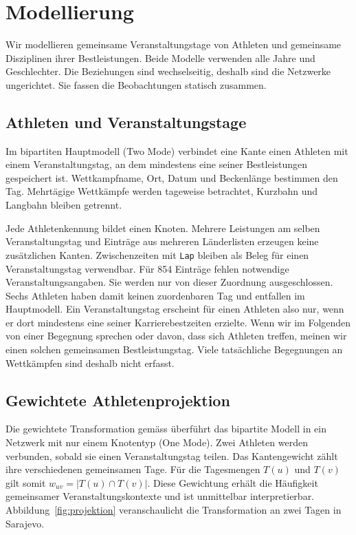 \section{Modellierung}
\label{sec:modellierung}

Wir modellieren gemeinsame Veranstaltungstage von Athleten und gemeinsame
Disziplinen ihrer Bestleistungen. Beide Modelle verwenden alle Jahre und
Geschlechter. Die Beziehungen sind wechselseitig, deshalb sind die Netzwerke
ungerichtet. Sie fassen die Beobachtungen statisch zusammen.

\subsection{Athleten und Veranstaltungstage}
Im bipartiten Hauptmodell (Two Mode) verbindet eine Kante einen Athleten mit einem
Veranstaltungstag, an dem mindestens eine seiner Bestleistungen gespeichert
ist. Wettkampfname, Ort, Datum und Beckenlänge bestimmen den Tag.
Mehrtägige Wettkämpfe werden tageweise betrachtet, Kurzbahn und Langbahn
bleiben getrennt.

Jede Athletenkennung bildet einen Knoten. Mehrere Leistungen am selben
Veranstaltungstag und Einträge aus mehreren Länderlisten erzeugen keine
zusätzlichen Kanten. Zwischenzeiten mit \texttt{Lap} bleiben als Beleg für
einen Veranstaltungstag verwendbar. Für 854 Einträge fehlen notwendige
Veranstaltungsangaben. Sie werden nur von dieser Zuordnung ausgeschlossen.
Sechs Athleten haben damit keinen zuordenbaren Tag und entfallen im
Hauptmodell. Ein Veranstaltungstag erscheint für einen Athleten also nur, wenn er dort mindestens eine seiner Karrierebestzeiten erzielte. Wenn wir im Folgenden von einer Begegnung sprechen oder davon, dass sich Athleten treffen, meinen wir einen solchen gemeinsamen Bestleistungstag. Viele tatsächliche Begegnungen an Wettkämpfen sind deshalb nicht erfasst.

\subsection{Gewichtete Athletenprojektion}
Die gewichtete Transformation gemäss \textcite[S.~38]{henninger2024}
überführt das bipartite Modell in ein Netzwerk mit nur einem Knotentyp (One Mode).
Zwei Athleten werden verbunden, sobald sie einen Veranstaltungstag teilen.
Das Kantengewicht zählt ihre verschiedenen gemeinsamen Tage. Für die
Tagesmengen $T(u)$ und $T(v)$ gilt somit
$w_{uv}=|T(u)\cap T(v)|$.
Diese Gewichtung erhält die Häufigkeit gemeinsamer Veranstaltungskontexte
und ist unmittelbar interpretierbar. Abbildung~\ref{fig:projektion}
veranschaulicht die Transformation an zwei Tagen in Sarajevo.

